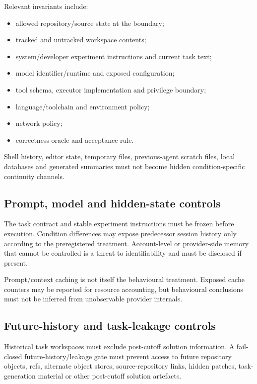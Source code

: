 Relevant invariants include:
\begin{itemize}
    \item allowed repository/source state at the boundary;
    \item tracked and untracked workspace contents;
    \item system/developer experiment instructions and current task text;
    \item model identifier/runtime and exposed configuration;
    \item tool schema, executor implementation and privilege boundary;
    \item language/toolchain and environment policy;
    \item network policy;
    \item correctness oracle and acceptance rule.
\end{itemize}

Shell history, editor state, temporary files, previous-agent scratch files, local databases and generated summaries must not become hidden condition-specific continuity channels.

\subsection{Prompt, model and hidden-state controls}

The task contract and stable experiment instructions must be frozen before execution. Condition differences may expose predecessor session history only according to the preregistered treatment. Account-level or provider-side memory that cannot be controlled is a threat to identifiability and must be disclosed if present.

Prompt/context caching is not itself the behavioural treatment. Exposed cache counters may be reported for resource accounting, but behavioural conclusions must not be inferred from unobservable provider internals.

\subsection{Future-history and task-leakage controls}

Historical task workspaces must exclude post-cutoff solution information. A fail-closed future-history/leakage gate must prevent access to future repository objects, refs, alternate object stores, source-repository links, hidden patches, task-generation material or other post-cutoff solution artefacts.

